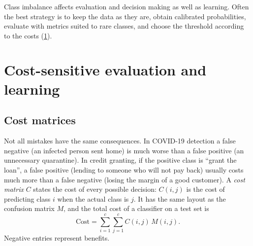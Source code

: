 \begin{keyidea}
Class imbalance affects evaluation and decision making as well as learning. Often the
best strategy is to keep the data as they are, obtain calibrated probabilities, evaluate with
metrics suited to rare classes, and choose the threshold according to the costs
(\cref{sec:costs}).
\end{keyidea}

\section{Cost-sensitive evaluation and learning}\label{sec:costs}

\subsection{Cost matrices}

Not all mistakes have the same consequences. In COVID-19 detection a false negative (an
infected person sent home) is much worse than a false positive (an unnecessary quarantine). In
credit granting, if the positive class is ``grant the loan'', a false positive (lending to
someone who will not pay back) usually costs much more than a false negative (losing the
margin of a good customer). A \emph{cost matrix} $C$ states the cost of every possible
decision: $C(i,j)$ is the cost of predicting class $i$ when the actual class is $j$. It has the
same layout as the confusion matrix $M$, and the total cost of a classifier on a test set is
\begin{equation}
  \text{Cost}=\sum_{i=1}^{c}\sum_{j=1}^{c}C(i,j)\,M(i,j).
\end{equation}
Negative entries represent benefits.


